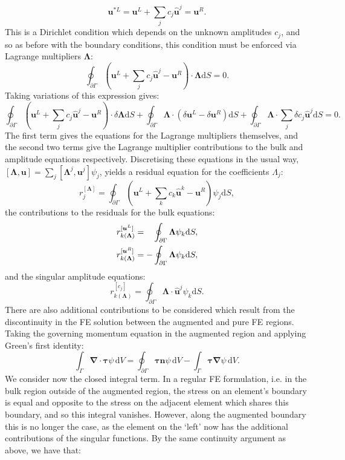 \documentclass[12pt,a4paper]{article}
\numberwithin{equation}{section}
\newcommand{\D}{\mathrm{d}}
\begin{document}
\begin{equation}
  \bm u^{*L} = \bm u^L + \sum_j c_j\hat{\bm u}^j = \bm u^R.
\end{equation}
This is a Dirichlet condition which depends on the unknown amplitudes $c_j$, and so as before with the boundary conditions, this condition must be enforced via Lagrange multipliers $\bm \Lambda$:
\begin{equation}
  \oint_{\partial\Gamma} \left(\bm u^L + \sum_j c_j\hat{\bm u}^j - \bm u^R \right)\cdot\bm \Lambda \D S = 0.
\end{equation}
%
Taking variations of this expression gives:
\begin{equation}
  \oint_{\partial\Gamma} \left(\bm u^L + \sum_j c_j\hat{\bm u}^j - \bm u^R \right)\cdot\delta\bm \Lambda \D S
  + \oint_{\partial\Gamma} \bm\Lambda\cdot(\delta \bm u^L - \delta\bm u^R)\D S
  + \oint_{\partial\Gamma}\bm\Lambda\cdot\sum_j\delta c_j\hat{\bm u}^j\D S = 0.
  \label{eqn:lagrange_mpy_variational}
\end{equation}
The first term gives the equations for the Lagrange multipliers themselves, and the second two terms give the Lagrange multiplier contributions to the bulk and amplitude equations respectively. Discretising these equations in the usual way, $[\bm \Lambda,\bm u] = \sum_j[\bm\Lambda^j,\bm u^j]\psi_j $, yields a residual equation for the coefficients $\Lambda_j$:
\begin{equation}
r^{[\bm \Lambda]}_{j} = \oint_{\partial\Gamma} \left(\bm u^L + \sum_k c_k\hat{\bm u}^k - \bm u^R \right)\psi_j \D S,
\end{equation}
the contributions to the residuals for the bulk equations:
\begin{align}
  r^{[\bm u^L]}_{k(\bm \Lambda)} &= \hphantom{-}\oint_{\partial\Gamma} \bm\Lambda \psi_k \D S, \\
  r^{[\bm u^R]}_{k(\bm \Lambda)} &= -\oint_{\partial\Gamma} \bm\Lambda \psi_k \D S,
\end{align}
and the singular amplitude equations:
\begin{equation}
 r^{[c_j]}_{k(\bm \Lambda)} = \oint_{\partial\Gamma}\bm\Lambda\cdot\hat{\bm u}^j \psi_k\D S.
\end{equation}
There are also additional contributions to be considered which result from the discontinuity in the FE solution between the augmented and pure FE regions. Taking the governing momentum equation in the augmented region and applying Green's first identity:
\begin{equation}
  \int_\Gamma \bm{\nabla}\cdot\bm{\tau} \psi\, \D V = \oint_{\partial\Gamma}\bm{\tau}\bm n \psi\,\D V - \int_\Gamma \bm{\tau}\bm\nabla\psi\,\D V.
\end{equation}
We consider now the closed integral term. In a regular FE formulation, i.e. in the bulk region outside of the augmented region, the stress on an element's boundary is equal and opposite to the stress on the adjacent element which shares this boundary, and so this integral vanishes. However, along the augmented boundary this is no longer the case, as the element on the `left' now has the additional contributions of the singular functions. By the same continuity argument as above, we have that:
\end{document}

